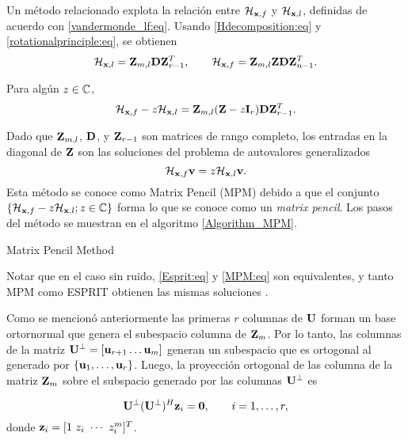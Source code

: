 	Un	método relacionado explota la relación entre $	\mathcal{H}_{\mathbf{x},f}$ y $\mathcal{H}_{\mathbf{x},l}$, definidas de acuerdo con \eqref{vandermonde_lf:eq}. Usando  \eqref{Hdecomposition:eq} y \eqref{rotationalprinciple:eq}, se obtienen
	\begin{equation}
		\mathcal{H}_{\mathbf{x},l} = \mathbf{Z}_{m,l}\mathbf{D}\mathbf{Z}_{r-1}^T, \qquad 	\mathcal{H}_{\mathbf{x},f} = \mathbf{Z}_{m,l}\mathbf{Z}\mathbf{D}\mathbf{Z}_{n-1}^T.
		\label{eq:VandermondeDecomposition}
	\end{equation}

	Para algún $z\in \mathbb{C}$, 
	\[\mathcal{H}_{\mathbf{x},f} -z \mathcal{H}_{\mathbf{x},l} = \mathbf{Z}_{m,l}(\mathbf{Z}-z\mathbf{I}_r)\mathbf{D}\mathbf{Z}_{r-1}^T.
	\]

	Dado que $\mathbf{Z}_{m,l}$, $\mathbf{D}$, y $\mathbf{Z}_{r-1}$ son matrices de rango completo, los entradas en la diagonal de $\mathbf{Z}$ son las soluciones del problema de autovalores generalizados
	\begin{equation}
		\mathcal{H}_{\mathbf{x},f} \mathbf{v} = z \mathcal{H}_{\mathbf{x},l}\mathbf{v}.
		\label{MPM:eq}
	\end{equation}
	Esta método se conoce como Matrix Pencil (MPM) \cite{Hua1990} debido a que el conjunto  $\{\mathcal{H}_{\mathbf{x},f} -z \mathcal{H}_{\mathbf{x},l}; z \in \mathbb{C}\}$ forma lo que se conoce como un \emph{matrix pencil}. Los pasos del método se muestran en el algoritmo \eqref{Algorithm_MPM}.

	\begin{algorithm}
		\caption{Matrix Pencil Method}
		\begin{algorithmic}[1]
		\end{algorithmic}
		\label{Algorithm_MPM}
	\end{algorithm}		
	Notar que en el caso sin ruido, \eqref{Esprit:eq} y \eqref{MPM:eq} son equivalentes, y tanto MPM como ESPRIT obtienen las mismas soluciones \cite{Hua1991}.	

	Como se mencionó anteriormente las primeras $r$ columnas de $\mathbf{U}$ forman un base ortornormal que genera el subespacio columna de $\mathbf{Z}_m$. Por lo tanto, las columnas de la matriz $\mathbf{U}^\perp = [\mathbf{u}_{r+1}\ldots\mathbf{u}_{m}]$ generan un subespacio que es ortogonal al generado por $\{\mathbf{u}_1,\ldots,\mathbf{u}_r\}$. Luego, la proyección ortogonal de las columna de la matriz $\mathbf{Z}_m$ sobre el subspacio generado por las columnas $\mathbf{U}^\perp$ es 

	\begin{equation}
		\mathbf{U}^\perp(\mathbf{U}^\perp)^H\mathbf{z}_i = \mathbf{0}, \qquad i = 1,\ldots,r,
        \label{eq:MUSIC2}
	\end{equation}
	donde $\mathbf{z}_i = [1\ z_i\ \cdots\  z_i^{m}]^T$.

